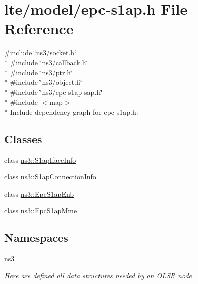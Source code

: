 \hypertarget{epc-s1ap_8h}{}\section{lte/model/epc-\/s1ap.h File Reference}
\label{epc-s1ap_8h}
{\ttfamily \#include \char`\"{}ns3/socket.\+h\char`\"{}}\\*
{\ttfamily \#include \char`\"{}ns3/callback.\+h\char`\"{}}\\*
{\ttfamily \#include \char`\"{}ns3/ptr.\+h\char`\"{}}\\*
{\ttfamily \#include \char`\"{}ns3/object.\+h\char`\"{}}\\*
{\ttfamily \#include \char`\"{}ns3/epc-\/s1ap-\/sap.\+h\char`\"{}}\\*
{\ttfamily \#include $<$map$>$}\\*
Include dependency graph for epc-\/s1ap.h\+:
\subsection*{Classes}
\begin{DoxyCompactItemize}
\item 
class \hyperlink{classns3_1_1S1apIfaceInfo}{ns3\+::\+S1ap\+Iface\+Info}
\item 
class \hyperlink{classns3_1_1S1apConnectionInfo}{ns3\+::\+S1ap\+Connection\+Info}
\item 
class \hyperlink{classns3_1_1EpcS1apEnb}{ns3\+::\+Epc\+S1ap\+Enb}
\item 
class \hyperlink{classns3_1_1EpcS1apMme}{ns3\+::\+Epc\+S1ap\+Mme}
\end{DoxyCompactItemize}
\subsection*{Namespaces}
\begin{DoxyCompactItemize}
\item 
 \hyperlink{namespacens3}{ns3}
\begin{DoxyCompactList}\small\item\em Here are defined all data structures needed by an O\+L\+SR node. \end{DoxyCompactList}\end{DoxyCompactItemize}
